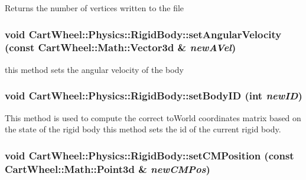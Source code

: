 Returns the number of vertices written to the file \hypertarget{classCartWheel_1_1Physics_1_1RigidBody_a3ab9df508e46d7d34914b8d15634fa3b}{
\subsubsection[{setAngularVelocity}]{\setlength{\rightskip}{0pt plus 5cm}void CartWheel::Physics::RigidBody::setAngularVelocity (const {\bf CartWheel::Math::Vector3d} \& {\em newAVel})}}
\label{classCartWheel_1_1Physics_1_1RigidBody_a3ab9df508e46d7d34914b8d15634fa3b}
this method sets the angular velocity of the body \hypertarget{classCartWheel_1_1Physics_1_1RigidBody_a7a121f4b57a20837db2a76c2c49f2598}{
\subsubsection[{setBodyID}]{\setlength{\rightskip}{0pt plus 5cm}void CartWheel::Physics::RigidBody::setBodyID (int {\em newID})}}
\label{classCartWheel_1_1Physics_1_1RigidBody_a7a121f4b57a20837db2a76c2c49f2598}
This method is used to compute the correct toWorld coordinates matrix based on the state of the rigid body this method sets the id of the current rigid body. \hypertarget{classCartWheel_1_1Physics_1_1RigidBody_a5febf2c580bc7085209f046e86b49229}{
\subsubsection[{setCMPosition}]{\setlength{\rightskip}{0pt plus 5cm}void CartWheel::Physics::RigidBody::setCMPosition (const {\bf CartWheel::Math::Point3d} \& {\em newCMPos})}}
\label{classCartWheel_1_1Physics_1_1RigidBody_a5febf2c580bc7085209f046e86b49229}

